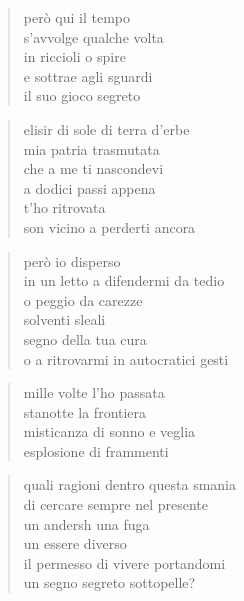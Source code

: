 	\begin{verse}
                però qui il tempo\\
                s’avvolge qualche volta\\
                in riccioli o spire\\
                e sottrae agli sguardi\\
                il suo gioco segreto
	\end{verse}

	\begin{verse}
                elisir di sole di terra d’erbe\\
                mia patria trasmutata\\
                che a me ti nascondevi\\
                a dodici passi appena\\
                t’ho ritrovata\\
                son vicino a perderti ancora
	\end{verse}

	\begin{verse}
                però io disperso\\
                in un letto a difendermi da tedio\\
                o peggio da carezze\\
                solventi sleali\\
                segno della tua cura\\
                o a ritrovarmi in autocratici gesti
	\end{verse}

	\begin{verse}
                mille volte l’ho passata\\
                stanotte la frontiera\\
                misticanza di sonno e veglia\\
                esplosione di frammenti
	\end{verse}

	\begin{verse}
                quali ragioni dentro questa smania\\
                di cercare sempre nel presente\\
                un andersh una fuga\\
                un essere diverso\\
                il permesso di vivere portandomi\\
                un segno segreto sottopelle?
	\end{verse}

